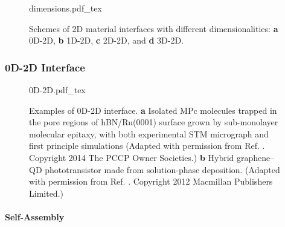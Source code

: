 \begin{figure}[!htbp]
  \centering
  {dimensions.pdf_tex}
  \caption{\label{fig:intro-dimensions} %
    Schemes of 2D material interfaces with different dimensionalities:
    \textbf{a} 0D-2D, \textbf{b} 1D-2D, \textbf{c} 2D-2D, and
    \textbf{d} 3D-2D.           %
  }
\end{figure}

\subsubsection{0D-2D Interface}
\label{sec:intro-0D-2D}

\begin{figure}[h]
  \centering
  {0D-2D.pdf_tex}
  \caption{\label{fig:intro-0D-2D}%
    Examples of 0D-2D interface. \textbf{a} Isolated MPc molecules
    trapped in the pore regions of hBN/Ru(0001) surface grown by
    sub-monolayer molecular epitaxy, with both experimental STM
    micro\-graph and first principle simulations (Adapted with
    permission from
    Ref. \cite{Iannuzzi_2014_MPc_hBN_Rh}. Copyright 2014 The PCCP
    Owner Societies.)  \textbf{b} Hybrid graphene–QD photo\-transistor
    made from solution-phase deposition. (Adapted with permission from
    Ref. \cite{Konstantatos_2012_QD_gr_trans}. Copyright 2012
    Macmillan Publishers Limited.)%
  }
\end{figure}

\paragraph{Self-Assembly}
\label{sec:org8117691}

